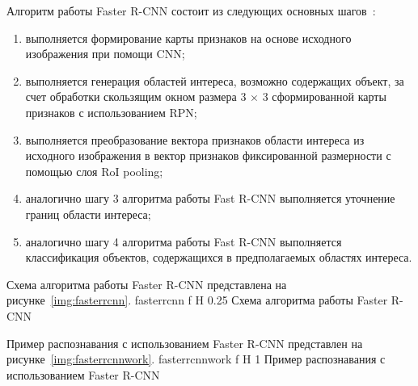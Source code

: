 Алгоритм работы Faster R-CNN состоит из следующих основных шагов~\cite{yolochina, rcnn, fasterrcnn}:
\begin{enumerate}
	\item выполняется формирование карты признаков на основе исходного изображения при помощи CNN;
	\item выполняется генерация областей интереса, возможно содержащих объект, за счет обработки скользящим окном размера 3 $\times$ 3 сформированной карты признаков с использованием RPN;
	\item выполняется преобразование вектора признаков области интереса из исходного изображения в вектор признаков фиксированной размерности с помощью слоя RoI pooling;
	\item аналогично шагу 3 алгоритма работы Fast R-CNN выполняется уточнение границ области интереса;
	\item аналогично шагу 4 алгоритма работы Fast R-CNN выполняется классификация объектов, содержащихся в предполагаемых областях интереса.
\end{enumerate}

\clearpage
Схема алгоритма работы Faster R-CNN представлена на рисунке~\ref{img:fasterrcnn}.
	{fasterrcnn}
	{f}
	{H}
	{0.25\textwidth}
	{Схема алгоритма работы Faster R-CNN}

Пример распознавания с использованием Faster R-CNN представлен на рисунке~\ref{img:fasterrcnnwork}.
	{fasterrcnnwork}
	{f}
	{H}
	{1\textwidth}
	{Пример распознавания с использованием Faster R-CNN}

